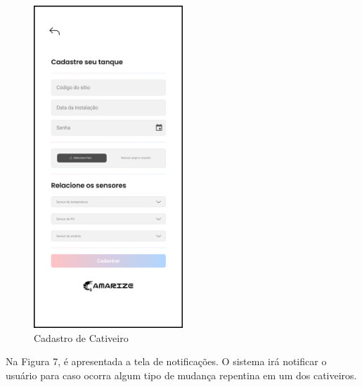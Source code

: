 \begin{figure}[!htb]
\centering
{}
\caption{Cadastro de Cativeiro}%
\label{fig:tela-cativeiro}
\includegraphics[width = 0.5\textwidth]{Imagem/Cadastrar_Cativeiro.png}
\end{figure}

\newpage

Na Figura 7, é apresentada a tela de notificações. O sistema irá notificar o usuário para caso ocorra algum tipo de mudança repentina em um dos cativeiros.

